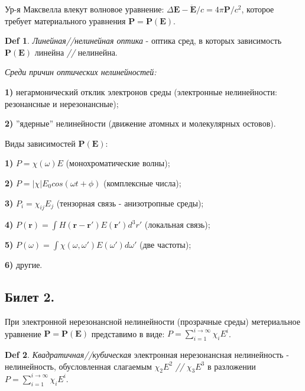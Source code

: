 \documentclass[a4paper,12pt]{article}
\theoremstyle{definition} %
\theoremstyle{definition} %
\newtheorem{Def}{Def}[section]
\theoremstyle{remark} %
\begin{document}
	Ур-я Максвелла влекут волновое уравнение: $\Delta \mathbf{E}-\ddot{\mathbf{E}}/c=4\pi \mathbf{P}/c^{2}$, которое требует материального уравнения $\mathbf{P} = \mathbf{P}(\mathbf{E})$.

\begin{Def}
	\textit{Линейная//нелинейная оптика} - оптика сред, в которых зависимость $\mathbf{P}(\mathbf{E})$ линейна \textit{//} нелинейна.
\end{Def}

	\textit{Среди причин оптических нелинейностей:} \\
	\par \textbf{1)} негармонический отклик электронов среды (электронные нелинейности: резонансные и нерезонансные); \\
	\par \textbf{2)} ''ядерные'' нелинейности (движение атомных и молекулярных остовов).


	Виды зависимостей $\mathbf{P}(\mathbf{E})$: \\
     \par \textbf{1)} $P=\chi (\omega) E$ (монохроматические волны); \\
     \par \textbf{2)} $P=|\chi|E_{0}cos(\omega t + \phi)$ (комплексные числа); \\
     \par \textbf{3)} $P_{i}=\chi_{ij}E_{j}$ (тензорная связь - анизотропные среды); \\
	 \par \textbf{4)} $P(\mathbf{r}) = \int H(\mathbf{r}-\mathbf{r}') E(\mathbf{r}') d^{3}r'$ (локальная связь); \\
	 \par \textbf{5)} $P(\omega) = \int \chi (\omega, \omega') E(\omega') d\omega'$ (две частоты); \\
	 \par \textbf{6)} другие.


\subsection{Билет 2.}


	При электронной нерезонансной нелинейности (прозрачные среды) метериальное уравнение $\mathbf{P}=\mathbf{P}(\mathbf{E})$ представимо в виде: $P=\sum\limits_{i=1}^{i \to \infty} \chi_{i} E^{i}$.

\begin{Def}
	\textit{Квадратичная//кубическая} электронная нерезонансная нелинейность - нелинейность, обусловленная слагаемым $\chi_{2} E^{2}$ \textit{//} $\chi_{3} E^{3}$ в разложении $P=\sum\limits_{i=1}^{i \to \infty} \chi_{i} E^{i}$.
\end{Def}
\end{document}
